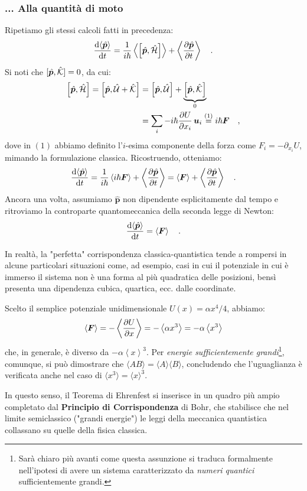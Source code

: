 \subsubsection{... Alla quantità di moto}
Ripetiamo gli stessi calcoli fatti in precedenza:
\[
    \dv{\langle \hat{\bm{p}} \rangle}{t} = \frac{1}{i\hbar}\left\langle  \left[ \hat{\bm{p}},\hat{\mathcal{H}} \right] \right\rangle + \left\langle \pdv{\hat{\bm{p}}}{t}\right\rangle \quad.
\]
Si noti che $[\hat{\bm{p}}, \hat{\mathcal{K}}] = 0$, da cui:
\[
\begin{aligned}
    \left[ \hat{\bm{p}},\hat{\mathcal{H}} \right] = \left[ \hat{\bm{p}},\hat{\mathcal{U}} + \hat{\mathcal{K}} \right] &= \left[ \hat{\bm{p}},\hat{\mathcal{U}} \right] + \underbrace{\left[ \hat{\bm{p}},\hat{\mathcal{K}} \right]}_0 \\
    &= \sum_i -i\hbar\pdv{U}{x_i} \, \bm{u}_i \overset{(1)}{=} i\hbar \bm{F} \quad,
\end{aligned}
\]
dove in $(1)$ abbiamo definito l'$i$-esima componente della forza come $F_i = -\partial_{x_i}U$, mimando la formulazione classica. Ricostruendo, otteniamo:
\[
    \dv{\langle \hat{\bm{p}} \rangle}{t} = \frac{1}{i\hbar}\left\langle i\hbar \bm{F} \right\rangle + \left\langle \pdv{\hat{\bm{p}}}{t}\right\rangle = \left\langle  \bm{F} \right\rangle + \left\langle \pdv{\hat{\bm{p}}}{t}\right\rangle\quad.
\]
Ancora una volta, assumiamo $\hat{\bm{p}}$ non dipendente esplicitamente dal tempo e ritroviamo la controparte quantomeccanica della seconda legge di Newton:
\begin{equation}
    \dv{\langle \hat{\bm{p}} \rangle}{t} = \left\langle  \bm{F} \right\rangle \quad.
\end{equation}

\begin{approfondimento}[title={Eccezioni alla regola}]
    \noindent
    In realtà, la "perfetta" corrispondenza classica-quantistica tende a rompersi in alcune particolari situazioni come, ad esempio, casi in cui il potenziale in cui è immerso il sistema non è una forma al più quadratica delle posizioni, bensì presenta una dipendenza cubica, quartica, ecc. dalle coordinate. 
    
    Scelto il semplice potenziale unidimensionale $U(x) = \alpha x^4/4$, abbiamo:
    \[
        \left\langle  \bm{F} \right\rangle = -\left\langle  \pdv{U}{x} \right\rangle = -\left\langle  \alpha x^3 \right\rangle = -\alpha \left\langle   x^3 \right\rangle
    \] 
    che, in generale, è diverso da $-\alpha \left\langle   x \right\rangle^3$. Per \emph{energie sufficientemente grandi}\footnote{Sarà chiaro più avanti come questa assunzione si traduca formalmente nell'ipotesi di avere un sistema caratterizzato da \emph{numeri quantici} sufficientemente grandi.}, comunque, si può dimostrare che $\langle AB \rangle = \langle A \rangle \langle B \rangle$, concludendo che l'uguaglianza è verificata anche nel caso di $\langle x^3 \rangle = \langle x \rangle^3$. 

    In questo senso, il Teorema di Ehrenfest si inserisce in un quadro più ampio completato dal \textbf{Principio di Corrispondenza} di Bohr, che stabilisce che nel limite semiclassico ("grandi energie") le leggi della meccanica quantistica collassano su quelle della fisica classica.
    
\end{approfondimento}
